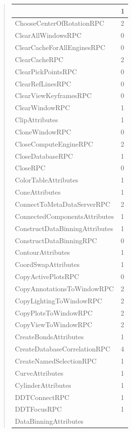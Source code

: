 \documentclass[letterpaper,10pt,english]{sphinxmanual}
\begin{document}
\begin{quote}
\begin{longtable}{|l|l|}
 & 
1
\\
\hline
ChooseCenterOfRotationRPC
 & 
2
\\
\hline
ClearAllWindowsRPC
 & 
0
\\
\hline
ClearCacheForAllEnginesRPC
 & 
0
\\
\hline
ClearCacheRPC
 & 
2
\\
\hline
ClearPickPointsRPC
 & 
0
\\
\hline
ClearRefLinesRPC
 & 
0
\\
\hline
ClearViewKeyframesRPC
 & 
0
\\
\hline
ClearWindowRPC
 & 
1
\\
\hline
ClipAttributes
 & 
1
\\
\hline
CloneWindowRPC
 & 
0
\\
\hline
CloseComputeEngineRPC
 & 
2
\\
\hline
CloseDatabaseRPC
 & 
1
\\
\hline
CloseRPC
 & 
0
\\
\hline
ColorTableAttributes
 & 
1
\\
\hline
ConeAttributes
 & 
1
\\
\hline
ConnectToMetaDataServerRPC
 & 
2
\\
\hline
ConnectedComponentsAttributes
 & 
1
\\
\hline
ConstructDataBinningAttributes
 & 
1
\\
\hline
ConstructDataBinningRPC
 & 
0
\\
\hline
ContourAttributes
 & 
1
\\
\hline
CoordSwapAttributes
 & 
1
\\
\hline
CopyActivePlotsRPC
 & 
0
\\
\hline
CopyAnnotationsToWindowRPC
 & 
2
\\
\hline
CopyLightingToWindowRPC
 & 
2
\\
\hline
CopyPlotsToWindowRPC
 & 
2
\\
\hline
CopyViewToWindowRPC
 & 
2
\\
\hline
CreateBondsAttributes
 & 
1
\\
\hline
CreateDatabaseCorrelationRPC
 & 
4
\\
\hline
CreateNamedSelectionRPC
 & 
1
\\
\hline
CurveAttributes
 & 
1
\\
\hline
CylinderAttributes
 & 
1
\\
\hline
DDTConnectRPC
 & 
1
\\
\hline
DDTFocusRPC
 & 
1
\\
\hline
DataBinningAttributes
 & 

\end{longtable}
\end{quote}
\end{document}

